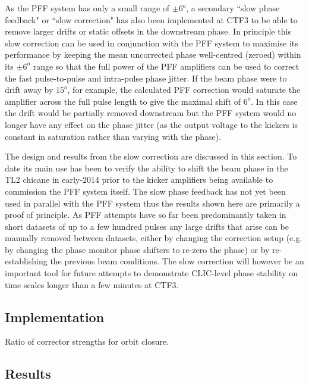 
As the PFF system has only a small range of \(\pm6^{o}\), a secondary ``slow phase feedback" or ``slow correction" has also been implemented at CTF3 to be able to remove larger drifts or static offsets in the downstream phase. In principle this slow correction can be used in conjunction with the PFF system to maximise its performance by keeping the mean uncorrected phase well-centred (zeroed) within its \(\pm6^{o}\) range so that the full power of the PFF amplifiers can be used to correct the fast pulse-to-pulse and intra-pulse phase jitter. If the beam phase were to drift away by \(15^{o}\), for example, the calculated PFF correction would saturate the amplifier across the full pulse length to give the maximal shift of \(6^{o}\). In this case the drift would be partially removed downstream but the PFF system would no longer have any effect on the phase jitter (as the output voltage to the kickers is constant in saturation rather than varying with the phase).

The design and results from the slow correction are discussed in this section. To date its main use has been to verify the ability to shift the beam phase in the TL2 chicane in early-2014 prior to the kicker amplifiers being available to commission the PFF system itself. The slow phase feedback has not yet been used in parallel with the PFF system thus the results shown here are primarily a proof of principle. As PFF attempts have so far been predominantly taken in short datasets of up to a few hundred pulses any large drifts that arise can be manually removed between datasets, either by changing the correction setup (e.g. by changing the phase monitor phase shifters to re-zero the phase) or by re-establishing the previous beam conditions. The slow correction will however be an important tool for future attempts to demonstrate CLIC-level phase stability on time scales longer than a few minutes at CTF3.

\subsection{Implementation}
\label{ss:slowCorrMethod}

Ratio of corrector strengths for orbit closure.

\subsection{Results}
\label{ss:slowCorrResults}




